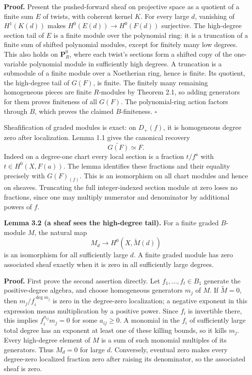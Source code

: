 \documentclass[11pt]{article}
\begin{document}
\textbf{Proof.} Present the pushed-forward sheaf on projective space as
a quotient of a finite sum \(E\) of twists, with coherent kernel \(K\).
For every large \(d\), vanishing of \(H^1(K(d))\) makes
\(H^0(E(d))\to H^0(F(d))\) surjective. The high-degree section tail of
\(E\) is a finite module over the polynomial ring: it is a truncation of
a finite sum of shifted polynomial modules, except for finitely many low
degrees. This also holds on \(\mathbf P_R^0\), where each twist's
sections form a shifted copy of the one-variable polynomial module in
sufficiently high degrees. A truncation is a submodule of a finite
module over a Noetherian ring, hence is finite. Its quotient, the
high-degree tail of \(G(F)\), is finite. The finitely many remaining
homogeneous pieces are finite \(R\)-modules by Theorem 2.1, so adding
generators for them proves finiteness of all \(G(F)\). The
polynomial-ring action factors through \(B\), which proves the claimed
\(B\)-finiteness. \(\square\)

Sheafification of graded modules is exact: on \(D_+(f)\), it is
homogeneous degree zero after localization. Lemma 1.1 gives the
canonical recovery \[
\widetilde{G(F)}\simeq F.
\] Indeed on a degree-one chart every local section is a fraction
\(t/f^a\) with \(t\in H^0(X,F(a))\). The lemma identifies these
fractions and their equality precisely with \(G(F)_{(f)}\). This is an
isomorphism on all chart modules and hence on sheaves. Truncating the
full integer-indexed section module at zero loses no fractions, since
one may multiply numerator and denominator by additional powers of
\(f\).

\textbf{Lemma 3.2 (a sheaf sees the high-degree tail).} For a finite
graded \(B\)-module \(M\), the natural map \[
M_d\longrightarrow H^0(X,\widetilde M(d))
\] is an isomorphism for all sufficiently large \(d\). A finite graded
module has zero associated sheaf exactly when it is zero in all
sufficiently large degrees.

\textbf{Proof.} First prove the second assertion directly. Let
\(f_1,\ldots,f_t\in B_1\) generate the positive-degree algebra, and
choose homogeneous generators \(m_j\) of \(M\). If \(\widetilde M=0\),
then \(m_j/f_i^{\deg m_j}\) is zero in the degree-zero localization; a
negative exponent in this expression means multiplication by a positive
power. Since \(f_i\) is invertible there, this implies
\(f_i^{a_{ij}}m_j=0\) for some \(a_{ij}\ge0\). A monomial in the \(f_i\)
of sufficiently large total degree has an exponent at least one of these
killing bounds, so it kills \(m_j\). Every high-degree element of \(M\)
is a sum of such monomial multiples of its generators. Thus \(M_d=0\)
for large \(d\). Conversely, eventual zero makes every degree-zero
localized fraction zero after raising its denominator, so the associated
sheaf is zero.
\end{document}

